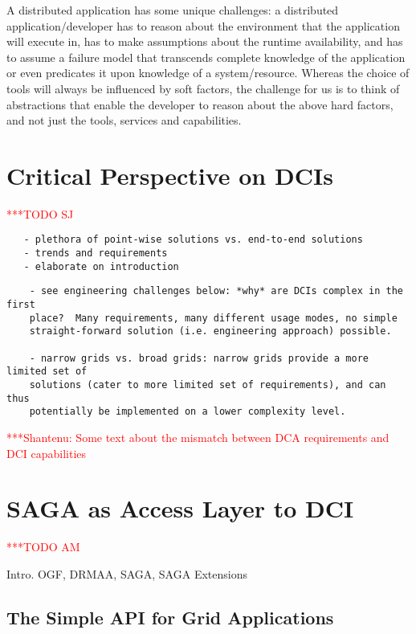 \documentclass[a4paper,10pt]{article}
\newcommand{\todo}[1]{     {\textcolor{red}  { ***TODO      #1 }}}
\newcommand{\jhanote}[1]{  {\textcolor{red}  { ***Shantenu: #1 }}}
\newcommand{\todo}[1]{}
\newcommand{\jhanote}[1]{}
\begin{document}
A distributed application has some unique challenges: a distributed
application/developer has to reason about the environment that the
application will execute in, has to make assumptions about the runtime
availability, and has to assume a failure model that transcends
complete knowledge of the application or even predicates it upon
knowledge of a system/resource.  Whereas the choice of tools will
always be influenced by soft factors, the challenge for us is to think
of abstractions that enable the developer to reason about the above
hard factors, and not just the tools, services and capabilities.



\section{Critical Perspective on DCIs}
\todo{SJ}

 \begin{verbatim}
   - plethora of point-wise solutions vs. end-to-end solutions
   - trends and requirements
   - elaborate on introduction
 \end{verbatim}

  \begin{verbatim}
    - see engineering challenges below: *why* are DCIs complex in the first
    place?  Many requirements, many different usage modes, no simple
    straight-forward solution (i.e. engineering approach) possible.

    - narrow grids vs. broad grids: narrow grids provide a more limited set of
    solutions (cater to more limited set of requirements), and can thus
    potentially be implemented on a lower complexity level.
  \end{verbatim}

  \jhanote{Some text about the mismatch between DCA requirements and
  DCI capabilities}

\section{SAGA as Access Layer to DCI}
\todo{AM}

  Intro. OGF, DRMAA, SAGA, SAGA Extensions\\

  \subsection{The Simple API for Grid Applications}
\end{document}
